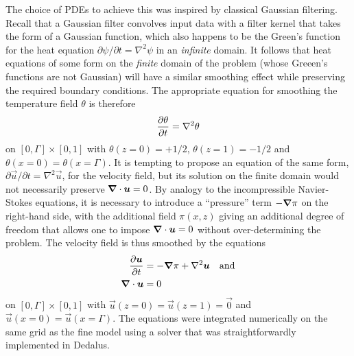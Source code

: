 \documentclass[../main.tex]{subfiles}
\begin{document}
The choice of PDEs to achieve this was inspired by classical Gaussian
filtering. Recall that a Gaussian filter convolves input data with a filter
kernel that takes the form of a Gaussian function, which also happens to be the
Green's function for the heat equation $\partial \psi / \partial t = \nabla^2
\psi$ in an \emph{infinite} domain. It follows that heat equations of some form
on the \emph{finite} domain of the \rb{} problem (whose Greeen's functions are
not Gaussian) will have a similar smoothing effect while preserving the
required boundary conditions. The appropriate equation for smoothing the
temperature field $\theta$ is therefore
\begin{equation}
    \label{eqn:diffusion_theta}
    \frac{\partial \theta}{\partial t} = \nabla^2 \theta
\end{equation}
on $[0, \Gamma] \times [0, 1]$ with $\theta(z=0) = +1/2$, $\theta(z=1) = -1/2$
and $\theta(x=0) = \theta(x=\Gamma)$. It is tempting to propose an equation of
the same form, $\partial \vec{u} / \partial t = \nabla^2 \vec{u}$, for the
velocity field, but its solution on the finite domain would not necessarily
preserve $\bm{\nabla} \cdot \bm{u} = 0$. By analogy to the incompressible
Navier-Stokes equations, it is necessary to introduce a ``pressure'' term
$-\bm{\nabla}\pi$ on the right-hand side, with the additional field $\pi(x,z)$ giving
an additional degree of freedom that allows one to impose $\bm{\nabla} \cdot \bm{u}
= 0$ without over-determining the problem. The velocity field is thus
smoothed by the equations
\begin{align}
    \label{eqn:diffusion_u}
    \frac{\partial \bm{u}}{\partial t} &= -\bm{\nabla}\pi + \nabla^2 \bm{u} \quad \text{and} \\
    \label{eqn:diffusion_continuity}
    \bm{\nabla} \cdot \bm{u} &= 0
\end{align}
on $[0, \Gamma] \times [0, 1]$ with $\vec{u}(z=0) = \vec{u}(z=1) = \vec{0}$ and
$\vec{u}(x=0) = \vec{u}(x=\Gamma)$. The equations
 were integrated
numerically on the same grid as the fine model using a solver that was
straightforwardly implemented in Dedalus.
\end{document}
